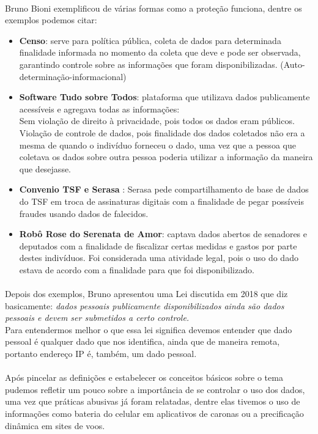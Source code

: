 \documentclass[12pt]{article}
\begin{document}
	\paragraph{}
		Bruno Bioni exemplificou de várias formas como a proteção funciona,
		dentre os exemplos podemos citar:	
		\begin{itemize}
			\item			
				\textbf{Censo}: serve para política pública, coleta de dados para
    			determinada finalidade informada no momento da coleta que deve e
    			pode ser observada, garantindo controle sobre as informações 
    			que foram disponibilizadas. (Auto-determinação-informacional)
    		\item
    			\textbf{Software Tudo sobre Todos}: plataforma que utilizava dados 
    			publicamente acessíveis e agregava todas as informações:\\    
    			Sem violação de direito à privacidade, pois todos os dados eram públicos.
    			Violação de controle de dados, pois finalidade dos dados coletados não era 
    			a mesma de quando o indivíduo forneceu o dado, uma vez que a pessoa
    			que coletava os dados sobre outra pessoa poderia utilizar a informação
    			da maneira que desejasse.
    		\item
    			\textbf{Convenio TSF e Serasa}	: Serasa pede compartilhamento de 
				base de dados do TSF em troca de assinaturas digitais com a 
				finalidade de pegar possíveis fraudes usando dados de falecidos.	
			\item
				\textbf{Robô Rose do Serenata de Amor}: captava dados abertos de 
				senadores e deputados com a finalidade de fiscalizar certas medidas e
				gastos por parte destes indivíduos. Foi considerada uma atividade legal,
				pois o uso do dado estava de acordo com a finalidade para que foi
				disponibilizado.
		\end{itemize}
	\paragraph{}
		Depois dos exemplos, Bruno apresentou uma Lei discutida em 2018 que
		diz basicamente: \textit{dados pessoais publicamente disponibilizados ainda são 
		dados pessoais e devem ser submetidos a certo controle.}\\
		Para entendermos melhor o que essa lei significa devemos entender que
		dado pessoal é qualquer dado que nos identifica, ainda que de maneira remota,
		portanto endereço IP é, também, um dado pessoal.
	\paragraph{}
		Após pincelar as definições e estabelecer os conceitos básicos sobre o tema
		pudemos refletir um pouco sobre a importância de se controlar o uso
		dos dados, uma vez que práticas abusivas já foram relatadas, dentre elas
		tivemos o uso de informações como bateria do celular em aplicativos
		de caronas ou a precificação dinâmica em sites de voos.
\end{document}
